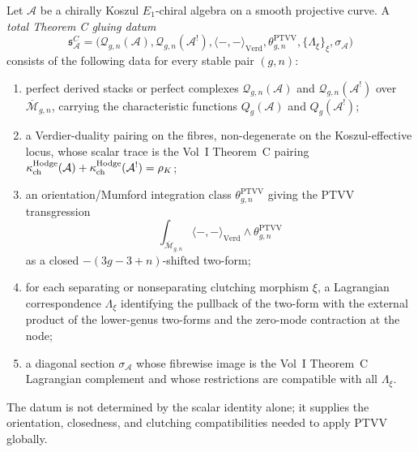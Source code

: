 \begin{definition}
\label{def:theoremC-total-gluing-datum}
Let \(\mathcal A\) be a chirally Koszul \(E_1\)-chiral algebra on a
smooth projective curve.  A \emph{total Theorem C gluing datum}
\[
\mathfrak s_{\mathcal A}^{C}
=
\bigl(\mathcal Q_{g,n}(\mathcal A),\mathcal Q_{g,n}(\mathcal A^!),
\langle-,-\rangle_{\mathrm{Verd}},
\theta_{g,n}^{\mathrm{PTVV}},
\{\Lambda_\xi\}_\xi,\sigma_{\mathcal A}\bigr)
\]
consists of the following data for every stable pair \((g,n)\):
\begin{enumerate}[label=\textup{(\roman*)},leftmargin=1.8em]
\item perfect derived stacks or perfect complexes
\(\mathcal Q_{g,n}(\mathcal A)\) and
\(\mathcal Q_{g,n}(\mathcal A^!)\) over
\(\overline{\mathcal M}_{g,n}\), carrying the characteristic functions
\(Q_g(\mathcal A)\) and \(Q_g(\mathcal A^!)\);
\item a Verdier-duality pairing on the fibres, non-degenerate on the
Koszul-effective locus, whose scalar trace is the Vol~I Theorem~C
pairing
\(\kappa_{\mathrm{ch}}^{\mathrm{Hodge}}(\mathcal A)+\kappa_{\mathrm{ch}}^{\mathrm{Hodge}}(\mathcal A^!)=\rho_K\);
\item an orientation/Mumford integration class
\(\theta_{g,n}^{\mathrm{PTVV}}\) giving the PTVV transgression
\[
\int_{\overline{\mathcal M}_{g,n}}
\langle-,-\rangle_{\mathrm{Verd}}\wedge
\theta_{g,n}^{\mathrm{PTVV}}
\]
as a closed \( -(3g-3+n)\)-shifted two-form;
\item for each separating or nonseparating clutching morphism \(\xi\),
a Lagrangian correspondence \(\Lambda_\xi\) identifying the pullback of
the two-form with the external product of the lower-genus two-forms and
the zero-mode contraction at the node;
\item a diagonal section \(\sigma_{\mathcal A}\) whose fibrewise image
is the Vol~I Theorem~C Lagrangian complement and whose restrictions
are compatible with all \(\Lambda_\xi\).
\end{enumerate}
The datum is not determined by the scalar identity alone; it supplies
the orientation, closedness, and clutching compatibilities needed to
apply PTVV globally.
\end{definition}

